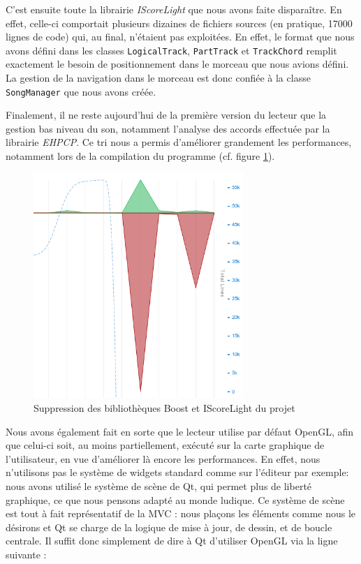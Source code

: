 C'est ensuite toute la librairie \textit{IScoreLight} que nous avons faite disparaître. En effet, celle-ci comportait plusieurs dizaines de fichiers sources (en pratique, 17000 lignes de code) qui, au final, n'étaient pas exploitées. En effet, le format que nous avons défini dans les classes \texttt{LogicalTrack}, \texttt{PartTrack} et \texttt{TrackChord} remplit exactement le besoin de positionnement dans le morceau que nous avions défini. La gestion de la navigation dans le morceau est donc confiée à la classe \texttt{SongManager} que nous avons créée.

Finalement, il ne reste aujourd'hui de la première version du lecteur que la gestion bas niveau du son, notamment l'analyse des accords effectuée par la librairie \textit{EHPCP}. Ce tri nous a permis d'améliorer grandement les performances, notamment lors de la compilation du programme (cf. figure \ref{refonte_code}).

\begin{figure}[H]
\begin{center}
\includegraphics[width=300px]{refonte_code.png}
\caption{Suppression des bibliothèques Boost et IScoreLight du projet}
\label{refonte_code}
\end{center}
\end{figure}

Nous avons également fait en sorte que le lecteur utilise par défaut OpenGL, afin que celui-ci soit, au moins partiellement, exécuté sur la carte graphique de l'utilisateur, en vue d'améliorer là encore les performances. En effet, nous n'utilisons pas le système de widgets standard comme sur l'éditeur par exemple: nous avons utilisé le système de scène de Qt, qui permet plus de liberté graphique, ce que nous pensons adapté au monde ludique.
Ce système de scène est tout à fait représentatif de la MVC : nous plaçons les éléments comme nous le désirons et Qt se charge
de la logique de mise à jour, de dessin, et de boucle centrale. Il suffit donc simplement de dire à Qt d'utiliser OpenGL via la ligne suivante :

